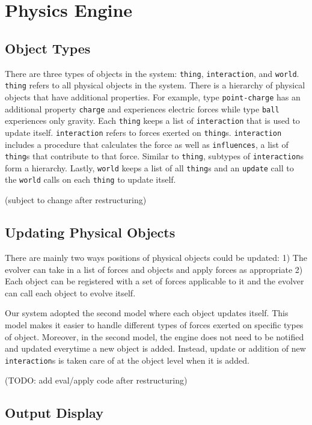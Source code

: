 \documentclass{article}
\begin{document}
\section{Physics Engine}
\subsection{Object Types}

There are three types of objects in the system: \texttt{thing}, \texttt{interaction}, and \texttt{world}. \texttt{thing} refers to all physical objects in the system. There is a hierarchy of physical objects that have additional properties. For example, type \texttt{point-charge} has an additional property \texttt{charge} and experiences electric forces while type \texttt{ball} experiences only gravity. Each \texttt{thing} keeps a list of \texttt{interaction} that is used to update itself. \texttt{interaction} refers to forces exerted on \texttt{thing}s. \texttt{interaction} includes a procedure that calculates the force as well as \texttt{influences}, a list of \texttt{thing}s that contribute to that force. Similar to \texttt{thing}, subtypes of \texttt{interaction}s form a hierarchy. Lastly, \texttt{world} keeps a list of all \texttt{thing}s and an \texttt{update} call to the \texttt{world} calls on each \texttt{thing} to update itself.

(subject to change after restructuring)

\subsection{Updating Physical Objects}

There are mainly two ways positions of physical objects could be updated: 1)
The evolver can take in a list of forces and objects and apply forces as
appropriate 2) Each object can be registered with a set of forces applicable to
it and the evolver can call each object to evolve itself.

Our system adopted the second model where each object updates itself. This
model makes it easier to handle different types of forces exerted on specific
types of object. Moreover, in the second model, the engine does not need to be
notified and updated everytime a new object is added. Instead, update or
addition of new \texttt{interaction}s is taken care of at the object level when
it is added.

(TODO: add eval/apply code after restructuring)

\subsection{Output Display}
\end{document}
